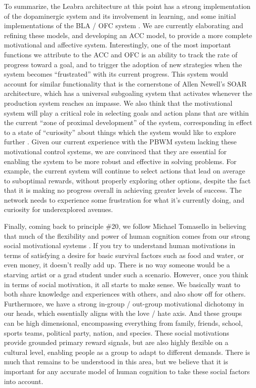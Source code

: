 \documentclass[11pt,twoside]{article}
\begin{document}
To summarize, the Leabra architecture at this point has a strong
implementation of the dopaminergic system and its involvement in learning, and
some initial implementations of the BLA / OFC system
\cite{PauliHazyOReilly12}.  We are currently elaborating and refining these
models, and developing an ACC model, to provide a more complete motivational
and affective system.  Interestingly, one of the most important functions we
attribute to the ACC and OFC is an ability to track the rate of progress
toward a goal, and to trigger the adoption of new strategies when the system
becomes ``frustrated'' with its current progress.  This system would account
for similar functionality that is the cornerstone of Allen Newell's SOAR
architecture, which has a universal subgoaling system that activates whenever
the production system reaches an impasse.  We also think that the motivational
system will play a critical role in selecting goals and action plans that are
within the current ``zone of proximal development'' of the system,
corresponding in effect to a state of ``curiosity'' about things which the
system would like to explore further \cite{HerdMingusOReilly10}.  Given our
current experience with the PBWM system lacking these motivational control
systems, we are convinced that they are essential for enabling the system to
be more robust and effective in solving problems.  For example, the current
system will continue to select actions that lead on average to suboptimal
rewards, without properly exploring other options, despite the fact that it is
making no progress overall in achieving greater levels of success.  The
network needs to experience some frustration for what it's currently doing,
and curiosity for underexplored avenues.

Finally, coming back to principle \#20, we follow Michael Tomasello in believing that much of the flexibility and power of human cognition comes from our strong social motivational systems \cite{Tomasello01}.  If you try to
understand human motivations in terms of satisfying a desire for basic
survival factors such as food and water, or even money, it doesn't really add
up.  There is no way someone would be a starving artist or a grad student
under such a scenario.  However, once you think in terms of social motivation,
it all starts to make sense.  We basically want to both share knowledge and
experiences with others, and also show off for others.  Furthermore, we have a
strong in-group / out-group motivational dichotomy in our heads, which
essentially aligns with the love / hate axis.  And these groups can be high
dimensional, encompassing everything from family, friends, school, sports
teams, political party, nation, and species.  These social motivations provide
grounded primary reward signals, but are also highly flexible on a cultural
level, enabling people as a group to adapt to different demands.  There is
much that remains to be understood in this area, but we believe that it is
important for any accurate model of human cognition to take these social
factors into account.
\end{document}
